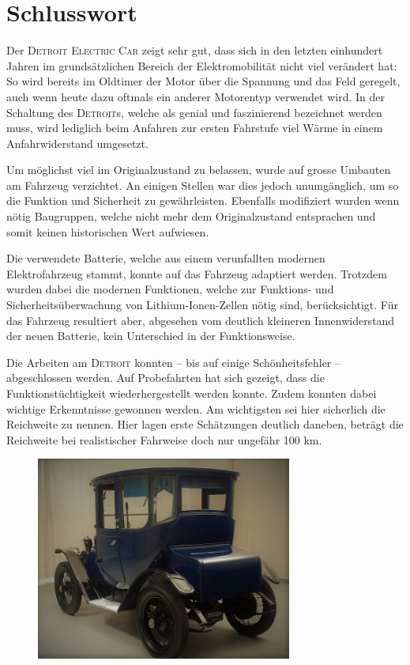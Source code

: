 \chapter{Schlusswort}
\color{blue}
Der \textsc{Detroit Electric Car} zeigt sehr gut, dass sich in den letzten einhundert Jahren im grundsätzlichen Bereich der Elektromobilität nicht viel verändert hat: So wird bereits im Oldtimer der Motor über die Spannung und das Feld geregelt, auch wenn heute dazu oftmals ein anderer Motorentyp verwendet wird. In der Schaltung des \textsc{Detroit}s, welche als genial und faszinierend bezeichnet werden muss, wird lediglich beim Anfahren zur ersten Fahrstufe viel Wärme in einem Anfahrwiderstand umgesetzt.

Um möglichst viel im Originalzustand zu belassen, wurde auf grosse Umbauten am Fahrzeug verzichtet. An einigen Stellen war dies jedoch unumgänglich, um so die Funktion und Sicherheit zu gewährleisten. Ebenfalls modifiziert wurden wenn nötig Baugruppen, welche nicht mehr dem Originalzustand entsprachen und somit keinen historischen Wert aufwiesen.

Die verwendete Batterie, welche aus einem verunfallten modernen Elektrofahrzeug stammt, konnte auf das Fahrzeug adaptiert werden. Trotzdem wurden dabei die modernen Funktionen, welche zur Funktions- und Sicherheitsüberwachung von Lithium-Ionen-Zellen nötig sind, berücksichtigt. Für das Fahrzeug resultiert aber, abgesehen vom deutlich kleineren Innenwiderstand der neuen Batterie, kein Unterschied in der Funktionsweise.

Die Arbeiten am \textsc{Detroit} konnten -- bis auf einige Schönheitsfehler -- abgeschlossen werden. Auf Probefahrten hat sich gezeigt, dass die Funktionstüchtigkeit wiederhergestellt werden konnte. Zudem konnten dabei wichtige Erkenntnisse gewonnen werden. Am wichtigsten sei hier sicherlich die Reichweite zu nennen. Hier lagen erste Schätzungen deutlich daneben, beträgt die Reichweite bei realistischer Fahrweise doch nur ungefähr 100 km.

\begin{figure}[h]
	\centering
		\includegraphics[width=0.75\textwidth]{images/Ende.jpg}
	\label{fig:Ende}
\end{figure}


\color{black}
